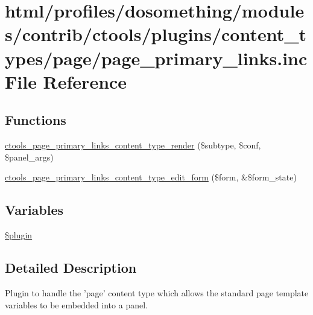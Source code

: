 \hypertarget{page__primary__links_8inc}{
\section{html/profiles/dosomething/modules/contrib/ctools/plugins/content\_\-types/page/page\_\-primary\_\-links.inc File Reference}
\label{page__primary__links_8inc}
}
\subsection*{Functions}
\begin{DoxyCompactItemize}
\item 
\hyperlink{page__primary__links_8inc_ab8d2e02aae2cba7c3be18b93668a353c}{ctools\_\-page\_\-primary\_\-links\_\-content\_\-type\_\-render} (\$subtype, \$conf, \$panel\_\-args)
\item 
\hyperlink{page__primary__links_8inc_adecf961a47fccf41c561c03fff4ce82e}{ctools\_\-page\_\-primary\_\-links\_\-content\_\-type\_\-edit\_\-form} (\$form, \&\$form\_\-state)
\end{DoxyCompactItemize}
\subsection*{Variables}
\begin{DoxyCompactItemize}
\item 
\hyperlink{page__primary__links_8inc_ada8a7130088351710bb02ed622d6bf65}{\$plugin}
\end{DoxyCompactItemize}


\subsection{Detailed Description}
Plugin to handle the 'page' content type which allows the standard page template variables to be embedded into a panel. 

